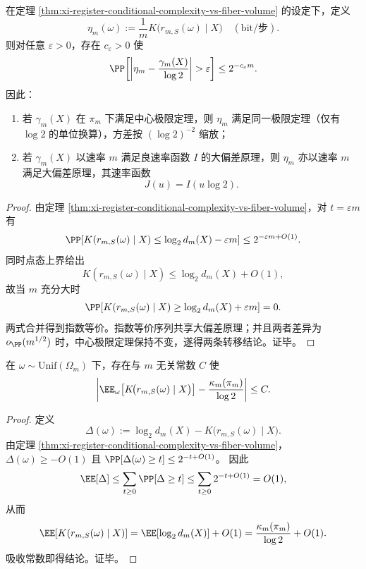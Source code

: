 \begin{theorem}[多重分形谱向算法复杂度谱的指数等价转移]\label{thm:xi-multifractal-to-algorithmic-spectrum-transfer}
在定理 \ref{thm:xi-register-conditional-complexity-vs-fiber-volume} 的设定下，定义
\[
\eta_m(\omega):=\frac1m K\!\bigl(r_{m,S}(\omega)\mid X\bigr)\quad(\text{bit/步}).
\]
则对任意 \(\varepsilon>0\)，存在 \(c_\varepsilon>0\) 使
\[
\PP\!\left[\left|\eta_m-\frac{\gamma_m(X)}{\log 2}\right|>\varepsilon\right]
\le 2^{-c_\varepsilon m}.
\]
因此：
\begin{enumerate}
  \item 若 \(\gamma_m(X)\) 在 \(\pi_m\) 下满足中心极限定理，则 \(\eta_m\) 满足同一极限定理（仅有 \(\log 2\) 的单位换算），方差按 \((\log2)^{-2}\) 缩放；
  \item 若 \(\gamma_m(X)\) 以速率 \(m\) 满足良速率函数 \(I\) 的大偏差原理，则 \(\eta_m\) 亦以速率 \(m\) 满足大偏差原理，其速率函数
  \[
  J(u)=I(u\log2).
  \]
\end{enumerate}
\end{theorem}
\begin{proof}
由定理 \ref{thm:xi-register-conditional-complexity-vs-fiber-volume}，对 \(t=\varepsilon m\) 有
\[
\PP\!\left[K(r_{m,S}(\omega)\mid X)\le \log_2 d_m(X)-\varepsilon m\right]
\le 2^{-\varepsilon m+O(1)}.
\]
同时点态上界给出
\[
K(r_{m,S}(\omega)\mid X)\le \log_2 d_m(X)+O(1),
\]
故当 \(m\) 充分大时
\[
\PP\!\left[K(r_{m,S}(\omega)\mid X)\ge \log_2 d_m(X)+\varepsilon m\right]=0.
\]
两式合并得到指数等价。指数等价序列共享大偏差原理；并且两者差异为 \(o_{\PP}(m^{1/2})\) 时，中心极限定理保持不变，遂得两条转移结论。证毕。
\end{proof}

\begin{theorem}\label{thm:xi-fiber-entropy-potential-expected-conditional-complexity}
在 \(\omega\sim\mathrm{Unif}(\Omega_m)\) 下，存在与 \(m\) 无关常数 \(C\) 使
\[
\left|
\EE_{\omega}\!\left[K\!\bigl(r_{m,S}(\omega)\mid X\bigr)\right]
-\frac{\kappa_m(\pi_m)}{\log2}
\right|
\le C.
\]
\end{theorem}
\begin{proof}
定义
\[
\Delta(\omega):=\log_2 d_m(X)-K\!\bigl(r_{m,S}(\omega)\mid X\bigr).
\]
由定理 \ref{thm:xi-register-conditional-complexity-vs-fiber-volume}，\(\Delta(\omega)\ge -O(1)\) 且
\(\PP[\Delta(\omega)\ge t]\le 2^{-t+O(1)}\)。
因此
\[
\EE[\Delta]\le \sum_{t\ge0}\PP[\Delta\ge t]\le \sum_{t\ge0}2^{-t+O(1)}=O(1),
\]
从而
\[
\EE\!\left[K(r_{m,S}(\omega)\mid X)\right]
=\EE[\log_2 d_m(X)]+O(1)
=\frac{\kappa_m(\pi_m)}{\log2}+O(1).
\]
吸收常数即得结论。证毕。
\end{proof}

